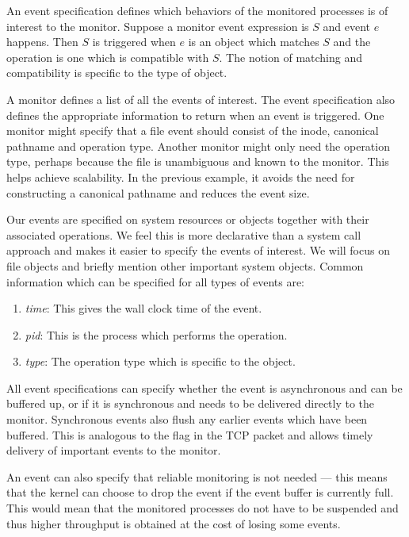 An event specification defines which behaviors
of the monitored processes is of interest to the monitor.
Suppose a monitor event expression is $S$
and event $e$ happens. Then $S$ is triggered when $e$ is an object 
which matches $S$ and the operation is one which is compatible with $S$.
The notion of matching and compatibility is specific to the type of object.

A monitor defines a list of all the events of interest.
The event specification also defines the appropriate
information to return when an event is triggered.
One monitor might specify that a file event should 
consist of the inode, canonical pathname and operation type.
Another monitor might only need the operation type, perhaps because
the file is unambiguous and known to the monitor.
This helps achieve scalability. In the previous example,
it avoids the need for constructing a canonical
pathname and reduces the event size.

Our events are specified on system resources or objects together with their
associated operations. 
We feel this is more declarative than a system call approach
and makes it easier to specify the events of interest.
We will focus on file objects and briefly mention
other important system objects.
Common information which can be specified
for all types of events are:
\begin{enumerate}
\item {\em time}:
This gives the wall clock time of the event.
\item {\em pid}:
This is the process which performs the operation.
\item {\em type}:
The operation type which is specific to the object.
\end{enumerate}

All event specifications can 
specify whether the event is asynchronous and can be buffered up,
or if it is synchronous and needs to be delivered directly to the monitor.
Synchronous events also flush any earlier events which have been buffered.
This is analogous to the  flag in the TCP packet
and allows timely delivery of important events to the monitor.

An event can also specify that reliable monitoring is not needed ---
this means that the kernel can choose to drop the event if the 
event buffer is currently full.
This would mean that the monitored processes do not have to be suspended
and thus higher throughput is obtained at the cost of losing some events.

